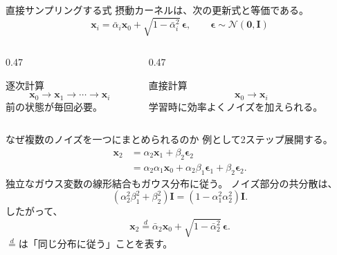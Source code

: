 \begin{frame}{直接サンプリングする式}
    摂動カーネルは、次の更新式と等価である。
    \[
        \boxed{
        \boldsymbol{x}_i
        =
        \bar{\alpha}_i\boldsymbol{x}_0
        +
        \sqrt{1-\bar{\alpha}_i^2}\,
        \boldsymbol{\epsilon},
        \qquad
        \boldsymbol{\epsilon}
        \sim\mathcal{N}(\boldsymbol{0},\boldsymbol{I})
        }
        \tag{2.2.1}
    \]
    \begin{columns}[T,onlytextwidth]
        \begin{column}{0.47\textwidth}
            \begin{alertblock}{逐次計算}
                \[
                    \boldsymbol{x}_0\to\boldsymbol{x}_1
                    \to\cdots\to\boldsymbol{x}_i
                \]
                前の状態が毎回必要。
            \end{alertblock}
        \end{column}
        \begin{column}{0.47\textwidth}
            \begin{exampleblock}{直接計算}
                \[
                    \boldsymbol{x}_0\longrightarrow\boldsymbol{x}_i
                \]
                学習時に効率よくノイズを加えられる。
            \end{exampleblock}
        \end{column}
    \end{columns}
\end{frame}
\begin{frame}{なぜ複数のノイズを一つにまとめられるのか}
    例として2ステップ展開する。
    \begin{align*}
        \boldsymbol{x}_2
        &=
        \alpha_2\boldsymbol{x}_1+\beta_2\boldsymbol{\epsilon}_2\\
        &=
        \alpha_2\alpha_1\boldsymbol{x}_0
        +
        \alpha_2\beta_1\boldsymbol{\epsilon}_1
        +
        \beta_2\boldsymbol{\epsilon}_2.
    \end{align*}
    独立なガウス変数の線形結合もガウス分布に従う。
    ノイズ部分の共分散は、
    \[
        (\alpha_2^2\beta_1^2+\beta_2^2)\boldsymbol{I}
        =
        (1-\alpha_1^2\alpha_2^2)\boldsymbol{I}.
    \]
    したがって、
    \[
        \boldsymbol{x}_2
        \overset{d}{=}
        \bar{\alpha}_2\boldsymbol{x}_0
        +
        \sqrt{1-\bar{\alpha}_2^2}\,\boldsymbol{\epsilon}.
    \]
    \footnotesize
    $\overset{d}{=}$は「同じ分布に従う」ことを表す。
\end{frame}
